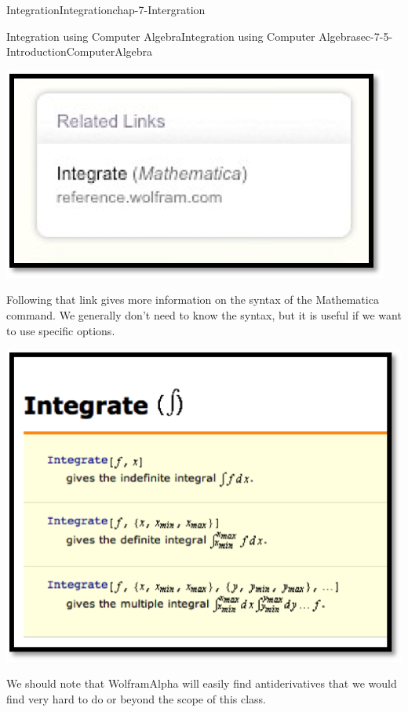 \documentclass[oneside,10pt,]{book}
\numberwithin{equation}{section}
\begin{document}
\begin{chapterptx}{Integration}{}{Integration}{}{}{chap-7-Intergration}
\begin{sectionptx}{Integration using Computer Algebra}{}{Integration using Computer Algebra}{}{}{sec-7-5-IntroductionComputerAlgebra}
\begin{sidebyside}{1}{0.25}{0.25}{0}
\begin{sbspanel}{0.5}
\includegraphics[width=1\linewidth]{images/sec7-5-5.png}
\end{sbspanel}%
\end{sidebyside}%
\par
\hypertarget{p-2887}{}%
Following that link gives more information on the syntax of the Mathematica command.  We generally don't need to know the syntax, but it is useful if we want to use specific options.%
\begin{sidebyside}{1}{0}{0}{0}%
\begin{sbspanel}{1}%
\includegraphics[width=1\linewidth]{images/sec7-5-6.png}
\end{sbspanel}%
\end{sidebyside}%
\par
\hypertarget{p-2888}{}%
We should note that Wolfram\textbar{}Alpha will easily find antiderivatives that we would find very hard to do or beyond the scope of this class.%

\end{sectionptx}
\end{chapterptx}
\end{document}
